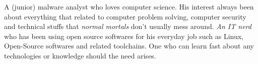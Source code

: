 

\begin{cvparagraph}

A (junior) malware analyst who loves computer science. His interest always been about everything that related to computer problem solving, computer security and technical stuffs that \textit{normal mortals} don't usually mess around. \textit{An IT nerd} who has been using open source softwares for his everyday job such as Linux, Open-Source softwares and related toolchains. One who can learn fast about any technologies or knowledge should the need arises.
\end{cvparagraph}
